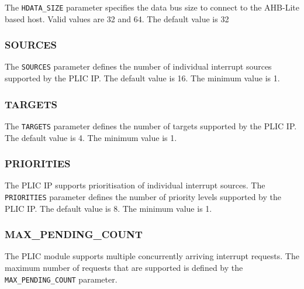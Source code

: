 The \texttt{HDATA\_SIZE} parameter specifies the data bus size to
connect to the AHB-Lite based host. Valid values are 32 and 64. The
default value is 32

\hypertarget{SOURCES}{\subsubsection{SOURCES}\label{sec:SOURCES}}

The \texttt{SOURCES} parameter defines the number of individual
interrupt sources supported by the PLIC IP. The default value is 16. The
minimum value is 1.

\hypertarget{TARGETS}{\subsubsection{TARGETS}\label{sec:TARGETS}}

The \texttt{TARGETS} parameter defines the number of targets supported
by the PLIC IP. The default value is 4. The minimum value is 1.

\subsubsection{PRIORITIES}

\sloppy
The PLIC IP supports prioritisation of individual interrupt sources. The \texttt{PRIORITIES} parameter defines the number of priority levels supported by the PLIC IP. The default value is 8. The minimum value is 1.

\subsubsection{MAX\_PENDING\_COUNT}

\sloppy
The PLIC module supports multiple concurrently arriving interrupt
requests. The maximum number of requests that are supported is defined
by the \texttt{MAX\_PENDING\_COUNT} parameter.

\begin{comment}
This is unclear.
The MAX_PENDING_COUNT parameter determines how many edge triggered interrupts can be queued. This is per interrupt-source. Each interrupt-source has an interrupt-pending-counter. MAX_PENDING_COUNT indicates the max.number this counter can hold.
If there are more interrupts pending than the counter can hold, then the counter retains its value (ie it 'hit' a ceiling).
The minimum value, of course, is 0, which indicates no pending interrupt.
\end{comment}

